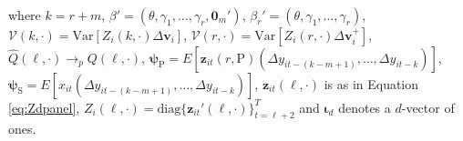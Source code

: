 \begin{thm}
\begin{align*}
  \end{align*}
  where $k = r + m$, $\beta' = (\theta, \gamma_1, \hdots, \gamma_{r}, \boldsymbol{0}_m')$, $\beta_r' = (\theta, \gamma_1, \hdots, \gamma_{r})$, $\mathcal{V}(k,\cdot) = \mbox{Var}\left[ Z_i(k,\cdot) \Delta \mathbf{v}_i  \right]$, $\mathcal{V}(r,\cdot) = \mbox{Var}\left[ Z_i(r,\cdot) \Delta \mathbf{v}^{+}_i  \right]$, $\widehat{Q}(\ell,\cdot) \rightarrow_p Q(\ell,\cdot)$, $\boldsymbol{\psi}_{\text{P}} = E[\textbf{z}_{it}(r,\text{P}) (\Delta y_{it -(k-m+1)}, \ldots, \Delta y_{it-k})]$, $\boldsymbol{\psi}_{\text{S}} = E[x_{it} (\Delta y_{it -(k-m+1)}, \ldots, \Delta y_{it-k})]$, $\mathbf{z}_{it}(\ell,\cdot)$ is as in Equation \ref{eq:Zdpanel}, $Z_i(\ell, \cdot)= \mbox{diag}\{\mathbf{z}_{it}'(\ell, \cdot)\}_{t=\ell+2}^T$ and $\boldsymbol{\iota}_{d}$ denotes a $d$-vector of ones.
\end{thm}

